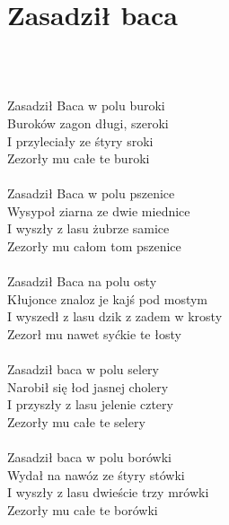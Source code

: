 \documentclass[a5paper, 10pt]{book}
\begin{document}


\newpage
\section{Zasadził baca}\textcolor{lightgray}{\textit{}}\\~\\
\begin{minipage}[t]{0.8\textwidth}
Zasadził Baca w polu buroki\\
Buroków zagon długi, szeroki\\
I przyleciały ze śtyry sroki\\
Zezorły mu całe te buroki\\
\\
Zasadził Baca w polu pszenice\\
Wysypoł ziarna ze dwie miednice\\
I wyszły z lasu żubrze samice\\
Zezorły mu całom tom pszenice\\
\\
Zasadził Baca na polu osty\\
Kłujonce znaloz je kajś pod mostym\\
I wyszedł z lasu dzik z zadem w krosty\\
Zezorł mu nawet syćkie te łosty\\
\\
Zasadził baca w polu selery\\
Narobił się łod jasnej cholery\\
I przyszły z lasu jelenie cztery\\
Zezorły mu całe te selery\\
\\
Zasadził baca w polu borówki\\
Wydał na nawóz ze śtyry stówki\\
I wyszły z lasu dwieście trzy mrówki\\
Zezorły mu całe te borówki\\
\\

\end{minipage}
\end{document}

